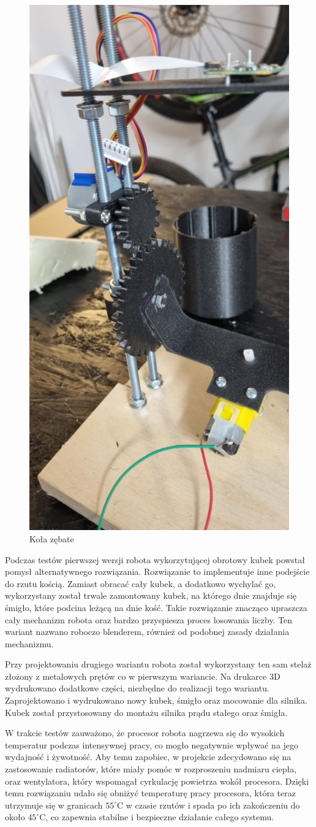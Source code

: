 \begin{figure}[H]
    \centering
    \includegraphics[width=0.25\linewidth, trim={65mm 75mm 0mm 180mm}, clip]{chapters/03-praca-wlasna/figures/koła_zębowe.png}
    \caption{\label{fig:zebatki}Koła zębate}
\end{figure}

Podczas testów pierwszej wersji robota wykorzytującej obrotowy kubek powstał pomysł alternatywnego rozwiązania.
Rozwiązanie to implementuje inne podejście do rzutu kością. Zamiast obracać cały kubek, a dodatkowo wychylać go,
wykorzystany został trwale zamontowany kubek, na którego dnie znajduje się śmigło, które podcina leżącą na dnie kość.
Takie rozwiązanie znacząco upraszcza cały mechanizm robota oraz bardzo przyspiesza proces losowania liczby. Ten wariant 
nazwano roboczo blenderem, również od podobnej zasady działania mechanizmu.

Przy projektowaniu drugiego wariantu robota został wykorzystany ten sam stelaż złożony z metalowych prętów co w 
pierwszym wariancie. Na drukarce 3D wydrukowano dodatkowe części, niezbędne do realizacji tego wariantu.
Zaprojektowano i wydrukowano nowy kubek, śmigło oraz mocowanie dla silnika. Kubek został przystosowany do montażu 
silnika prądu stałego oraz śmigła.

W trakcie testów zauważono, że procesor robota nagrzewa się do wysokich temperatur podczas intensywnej pracy, 
co mogło negatywnie wpływać na jego wydajność i żywotność. Aby temu zapobiec, w projekcie zdecydowano się na 
zastosowanie radiatorów, które miały pomóc w rozproszeniu nadmiaru ciepła, oraz wentylatora, który 
wspomagał cyrkulację powietrza wokół procesora. Dzięki temu rozwiązaniu udało się obniżyć temperaturę pracy 
procesora, która teraz utrzymuje się w granicach $55^{\circ}$C w czasie rzutów i spada po ich zakończeniu do około $45^{\circ}$C,
co zapewnia stabilne i bezpieczne działanie całego systemu. 

